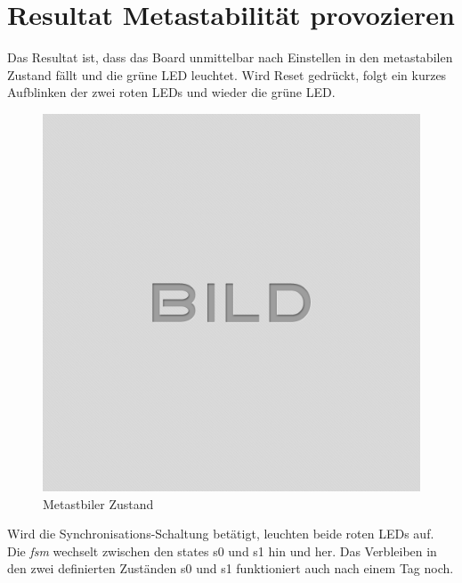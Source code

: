 \section{Resultat Metastabilität provozieren}\label{sect.meatastabil_proozieren}
Das Resultat ist, dass das Board unmittelbar nach Einstellen in den metastabilen Zustand fällt und die grüne LED leuchtet. Wird Reset gedrückt, folgt ein kurzes Aufblinken der zwei roten LEDs und wieder die grüne LED.\\
\begin{figure}[H]
	\centering
	\includegraphics[width=1\textwidth]{images/idle.png}
	\caption{Metastbiler Zustand}
	\label{fig.metastabil.Ergebnis_Boardasynchron}
\end{figure}


Wird die Synchronisations-Schaltung betätigt, leuchten beide roten LEDs auf. Die \textit{fsm} wechselt zwischen den states s0 und s1 hin und her. Das Verbleiben in den zwei definierten Zuständen s0 und s1 funktioniert auch nach einem Tag noch. \\

